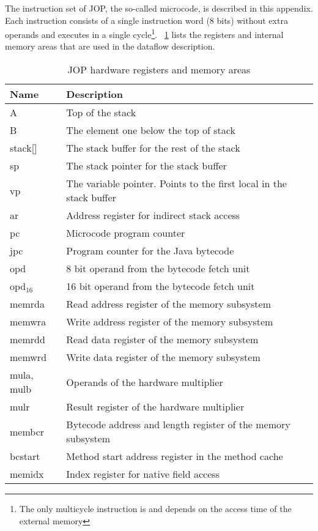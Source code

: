 %

The instruction set of JOP, the so-called microcode, is described in
this appendix. Each instruction consists of a single instruction
word (8 bits) without extra operands and executes in a single
cycle\footnote{The only multicycle instruction is 
and depends on the access time of the external memory}.
\tablename~\ref{tab:appendix:hwreg} lists the registers and internal
memory areas that are used in the dataflow description.

\begin{table}[h]
  \centering
  \begin{tabular}{ll}
    \toprule
    Name & Description \\
    \midrule
    A & Top of the stack\\
    B & The element one below the top of stack\\
    stack[] & The stack buffer for the rest of the stack\\
    sp & The stack pointer for the stack buffer\\
    vp & The variable pointer. Points to the first local in
    the stack buffer\\
    ar & Address register for indirect stack access\\
    pc & Microcode program counter\\
    jpc & Program counter for the Java bytecode\\
    opd & 8 bit operand from the bytecode fetch unit\\
    opd$_{16}$ & 16 bit operand from the bytecode fetch unit\\
    memrda & Read address register of the memory subsystem\\
    memwra & Write address register of the memory subsystem\\
    memrdd & Read data register of the memory subsystem\\
    memwrd & Write data register of the memory subsystem\\
    mula, mulb & Operands of the hardware multiplier\\
    mulr & Result register of the hardware multiplier\\
    membcr & Bytecode address and length register of the memory
    subsystem\\
    bcstart & Method start address register in the method cache\\
	memidx & Index register for native field access \\
    \bottomrule
  \end{tabular}
  \caption{JOP hardware registers and memory areas}\label{tab:appendix:hwreg}
\end{table}

\clearpage



%
